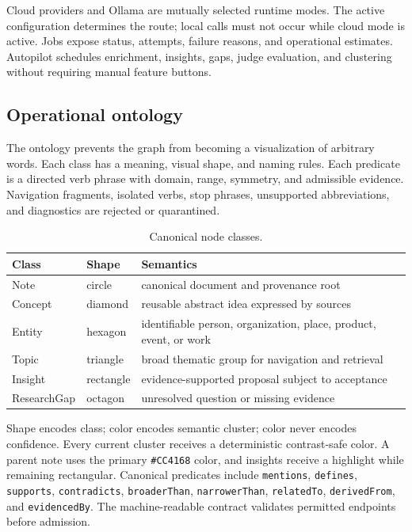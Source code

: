 \documentclass{sbc2023}
\newcommand{\code}[1]{\texttt{#1}}
\begin{document}
Cloud providers and Ollama are mutually selected runtime modes. The active configuration determines
the route; local calls must not occur while cloud mode is active. Jobs expose status, attempts,
failure reasons, and operational estimates. Autopilot schedules enrichment, insights, gaps, judge
evaluation, and clustering without requiring manual feature buttons.

\subsection{Operational ontology}

The ontology prevents the graph from becoming a visualization of arbitrary words. Each class has
a meaning, visual shape, and naming rules. Each predicate is a directed verb phrase with domain,
range, symmetry, and admissible evidence. Navigation fragments, isolated verbs, stop phrases,
unsupported abbreviations, and diagnostics are rejected or quarantined.

\begin{table}[!htbp]
\caption{Canonical node classes.}
\label{tab:nodes}
\centering
\scriptsize
\begin{tabularx}{\columnwidth}{p{1.48cm}p{0.98cm}Y}
\toprule
Class & Shape & Semantics \\
\midrule
Note & circle & canonical document and provenance root \\
Concept & diamond & reusable abstract idea expressed by sources \\
Entity & hexagon & identifiable person, organization, place, product, event, or work \\
Topic & triangle & broad thematic group for navigation and retrieval \\
Insight & rectangle & evidence-supported proposal subject to acceptance \\
Research\allowbreak Gap & octagon & unresolved question or missing evidence \\
\bottomrule
\end{tabularx}
\end{table}
\FloatBarrier

Shape encodes class; color encodes semantic cluster; color never encodes confidence. Every current
cluster receives a deterministic contrast-safe color. A parent note uses the primary
\code{\#CC4168} color, and insights receive a highlight while remaining rectangular. Canonical
predicates include \code{mentions}, \code{defines}, \code{supports}, \code{contradicts},
\code{broaderThan}, \code{narrowerThan}, \code{relatedTo}, \code{derivedFrom}, and
\code{evidencedBy}. The machine-readable contract validates permitted endpoints before admission.
\end{document}
